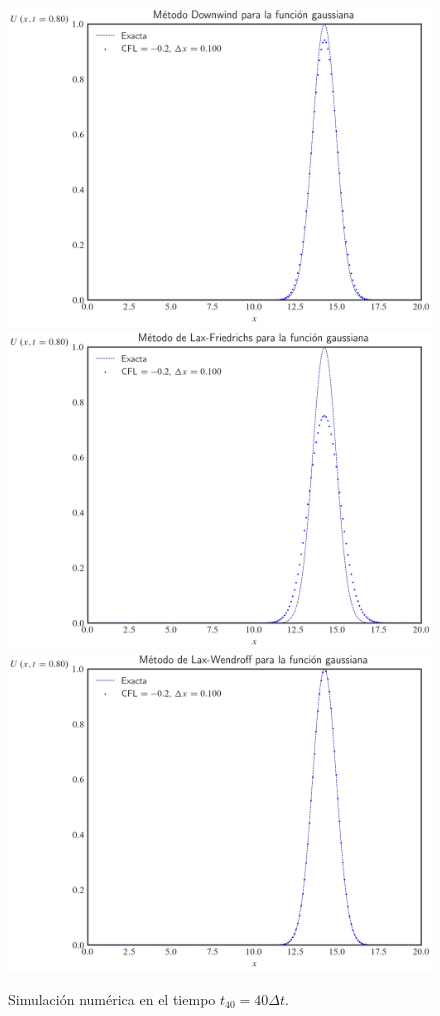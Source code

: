 \begin{figure}[ht!]
	\centering
	\includegraphics[width=.30\paperwidth]{../snapshots/downwindgaussian1d-40.png}
	\includegraphics[width=.30\paperwidth]{../snapshots/lax-friedrichsgaussiana1d-40.png}
	\includegraphics[width=.30\paperwidth]{../snapshots/lax-wendroffgaussiana1d-40.png}
	\caption{Simulación numérica en el tiempo $t_{40}=40\Delta t$.}
	\label{fig:example1t40}
\end{figure}


